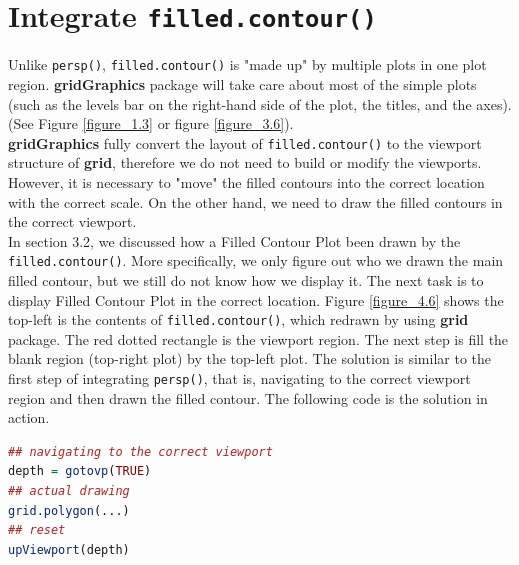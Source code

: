 \documentclass[paper=a4, fontsize=11pt]{report}
\begin{document}
\section{Integrate \texttt{filled.contour()}}
Unlike \texttt{persp()}, \texttt{filled.contour()} is "made up" by multiple plots in one plot region. \textbf{gridGraphics} package will take care about most of the simple plots (such as the levels bar on the right-hand side of the plot, the titles, and the axes). (See Figure \ref{figure_1.3} or figure \ref{figure_3.6}).\\
\textbf{gridGraphics} fully convert the layout of \texttt{filled.contour()} to the viewport structure of \textbf{grid}, therefore we do not need to build or modify the viewports. However, it is necessary to "move" the filled contours into the correct location with the correct scale. On the other hand, we need to draw the filled contours in the correct viewport.\\
In section 3.2, we discussed how a Filled Contour Plot been drawn by the \texttt{filled.contour()}. More specifically, we only figure out who we drawn the main filled contour, but we still do not know how we display it. The next task is to display Filled Contour Plot in the correct location. Figure \ref{figure_4.6} shows the top-left is the contents of \texttt{filled.contour()}, which redrawn by using \textbf{grid} package. The red dotted rectangle is the viewport region. The next step is fill the blank region (top-right plot) by the top-left plot. The solution is similar to the first step of integrating \texttt{persp()}, that is, navigating to the correct viewport region and then drawn the filled contour. The following code is the solution in action.
\begin{lstlisting}[language = R]
## navigating to the correct viewport
depth = gotovp(TRUE)
## actual drawing
grid.polygon(...)
## reset
upViewport(depth)
\end{lstlisting}
\end{document}
